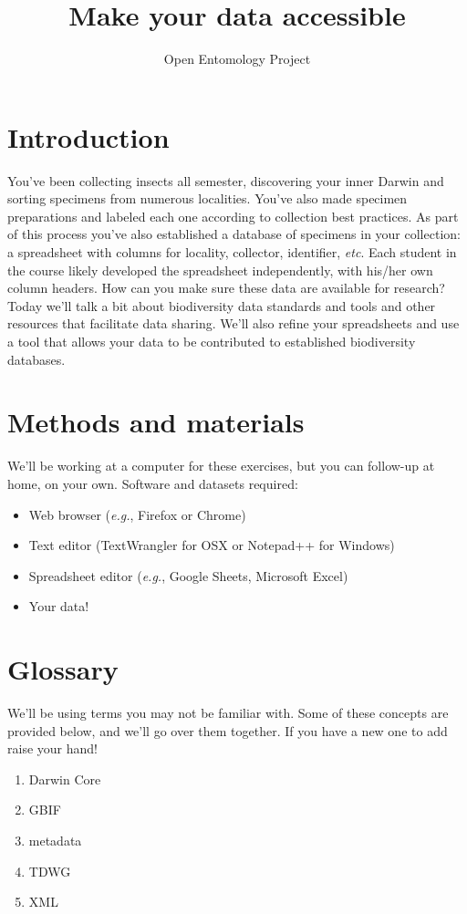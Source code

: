 \documentclass[11pt,letterpaper]{article}
\title{Make your data accessible}
\author{Open Entomology Project}
\begin{document}
\cleanlookdateon %
\maketitle
\thispagestyle{fancy}
\section*{Introduction}
You've been collecting insects all semester, discovering your inner Darwin and sorting specimens from numerous localities. You've also made specimen preparations and labeled each one according to collection best practices. As part of this process you've also established a database of specimens in your collection: a spreadsheet with columns for locality, collector, identifier, \textit{etc}. Each student in the course likely developed the spreadsheet independently, with his/her own column headers. How can you make sure these data are available for research?\\

\noindent{}Today we'll talk a bit about biodiversity data standards and tools and other resources that facilitate data sharing. We'll also refine your spreadsheets and use a tool that allows your data to be contributed to established biodiversity databases.

\section*{Methods and materials}
We'll be working at a computer for these exercises, but you can follow-up at home, on your own. Software and datasets required:
\begin{itemize}
\item Web browser (\textit{e.g.}, Firefox or Chrome)
\item Text editor (TextWrangler for OSX or Notepad++ for Windows)
\item Spreadsheet editor (\textit{e.g.}, Google Sheets, Microsoft Excel)
\item Your data!
\end{itemize}


\section*{Glossary}
We'll be using terms you may not be familiar with. Some of these concepts are provided below, and we'll go over them together. If you have a new one to add raise your hand!
\begin{enumerate} 
\item {Darwin Core}
\item {GBIF}
\item {metadata}
\item{TDWG} 
\item{XML}  
\end{enumerate}
\end{document}
